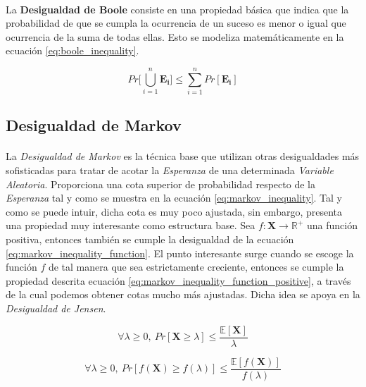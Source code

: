 \documentclass{subfiles}
\begin{document}
        \paragraph{}
        La \textbf{Desigualdad de Boole} consiste en una propiedad básica que indica que la probabilidad de que se cumpla la ocurrencia de un suceso es menor o igual que ocurrencia de la suma de todas ellas. Esto se modeliza matemáticamente en la ecuación \eqref{eq:boole_inequality}.

        \begin{equation}
        \label{eq:boole_inequality}
          Pr\bigg[\bigcup_{i=1}^n \boldsymbol{E_i}\bigg] \leq \sum_{i=1}^n Pr[\boldsymbol{E_i}]
        \end{equation}

      \subsection{Desigualdad de Markov}
      \label{sec:markov_inequality}

        \paragraph{}
        La \emph{Desigualdad de Markov} es la técnica base que utilizan otras desigualdades más sofisticadas para tratar de acotar la \emph{Esperanza} de una determinada \emph{Variable Aleatoria}. Proporciona una cota superior de probabilidad respecto de la \emph{Esperanza} tal y como se muestra en la ecuación \eqref{eq:markov_inequality}. Tal y como se puede intuir, dicha cota es muy poco ajustada, sin embargo, presenta una propiedad muy interesante como estructura base. Sea $f: \boldsymbol{X} \rightarrow \mathbb{R}^+$ una función positiva, entonces también se cumple la desigualdad de la ecuación \eqref{eq:markov_inequality_function}. El punto interesante surge cuando se escoge la función $f$ de tal manera que sea estrictamente creciente, entonces se cumple la propiedad descrita ecuación \eqref{eq:markov_inequality_function_positive}, a través de la cual podemos obtener cotas mucho más ajustadas. Dicha idea se apoya en la \emph{Desigualdad de Jensen}.

        \begin{equation}
        \label{eq:markov_inequality}
          \forall \lambda \geq 0, \ Pr[\boldsymbol{X} \geq \lambda ] \leq \frac{\mathbb{E}[\boldsymbol{X}]}{\lambda}
        \end{equation}

        \begin{equation}
        \label{eq:markov_inequality_function}
          \forall \lambda \geq 0, \ Pr[f(\boldsymbol{X}) \geq f(\lambda) ] \leq \frac{\mathbb{E}[f(\boldsymbol{X})]}{f(\lambda)}
        \end{equation}
\end{document}
